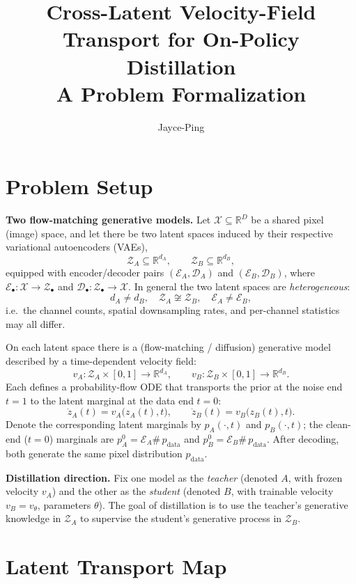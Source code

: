 \documentclass[11pt,a4paper]{article}
\title{\textbf{Cross-Latent Velocity-Field Transport for On-Policy Distillation}\\[0.3em]
\large A Problem Formalization}
\author{Jayce-Ping}
\date{}
\newcommand{\R}{\mathbb{R}}
\newcommand{\Xspace}{\mathcal{X}}
\newcommand{\Za}{\mathcal{Z}_{A}}
\newcommand{\Zb}{\mathcal{Z}_{B}}
\newcommand{\Enc}{\mathcal{E}}
\newcommand{\Dec}{\mathcal{D}}
\newcommand{\push}{\#}
\theoremstyle{definition}
\begin{document}
\maketitle

\section{Problem Setup}
\label{sec:setup}

\textbf{Two flow-matching generative models.}
Let $\Xspace\subseteq\R^{D}$ be a shared pixel (image) space, and let there be two
latent spaces induced by their respective variational autoencoders (VAEs),
\[
\Za\subseteq\R^{d_A},\qquad \Zb\subseteq\R^{d_B},
\]
equipped with encoder/decoder pairs $(\Enc_A,\Dec_A)$ and $(\Enc_B,\Dec_B)$, where
$\Enc_\bullet:\Xspace\to\mathcal{Z}_\bullet$ and $\Dec_\bullet:\mathcal{Z}_\bullet\to\Xspace$.
In general the two latent spaces are \emph{heterogeneous}:
\[
d_A\neq d_B,\quad \Za\not\cong\Zb,\quad \Enc_A\neq\Enc_B,
\]
i.e.\ the channel counts, spatial downsampling rates, and per-channel statistics may all differ.

On each latent space there is a (flow-matching / diffusion) generative model described by a
time-dependent velocity field:
\[
v_A:\Za\times[0,1]\to\R^{d_A},
\qquad
v_B:\Zb\times[0,1]\to\R^{d_B}.
\]
Each defines a probability-flow ODE that transports the prior at the noise end $t=1$ to the
latent marginal at the data end $t=0$:
\begin{equation}
\dot z_A(t) = v_A\big(z_A(t),t\big),
\qquad
\dot z_B(t) = v_B\big(z_B(t),t\big).
\label{eq:pf-ode}
\end{equation}
Denote the corresponding latent marginals by $p_A(\cdot,t)$ and $p_B(\cdot,t)$; the clean-end
($t=0$) marginals are $p_A^{0}=\Enc_A\push\, p_{\mathrm{data}}$ and
$p_B^{0}=\Enc_B\push\, p_{\mathrm{data}}$. After decoding, both generate the same pixel
distribution $p_{\mathrm{data}}$.

\textbf{Distillation direction.}
Fix one model as the \emph{teacher} (denoted $A$, with frozen velocity $v_A$) and the other as
the \emph{student} (denoted $B$, with trainable velocity $v_B=v_\theta$, parameters $\theta$).
The goal of distillation is to use the teacher's generative knowledge in $\Za$ to supervise the
student's generative process in $\Zb$.

\section{Latent Transport Map}
\label{sec:transport}
\end{document}
